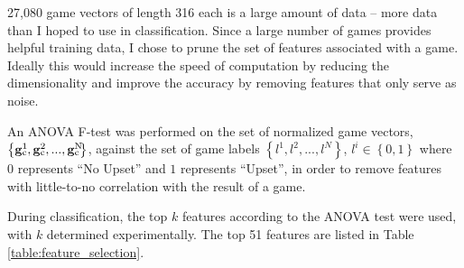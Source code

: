 \documentclass[]{article}
\def\SPSB#1#2{\rlap{\textsuperscript{#1}}\SB{#2}}
\def\SB#1{\textsubscript{{#1}}}
\begin{document}
27,080 game vectors of length 316 each is a large amount of data -- more data than I hoped to use in classification. Since a large number of games provides helpful training data, I chose to prune the set of features associated with a game. Ideally this would increase the speed of computation by reducing the dimensionality and improve the accuracy by removing features that only serve as noise.

An ANOVA F-test was performed on the set of normalized game vectors, $\left\{ \mathbf{g\SPSB{1}{c}}, \mathbf{g\SPSB{2}{c}}, ..., \mathbf{g\SPSB{N}{c}}\right\}$, against the set of game labels $\left\{ l^1, l^2, ..., l^N \right\}$, $l^i \in \left\{0,1\right\}$ where $0$ represents ``No Upset'' and $1$ represents ``Upset'', in order to remove features with little-to-no correlation with the result of a game.

During classification, the top $k$ features according to the ANOVA test were used, with $k$ determined experimentally. The top 51 features are listed in Table \ref{table:feature_selection}.
\end{document}
